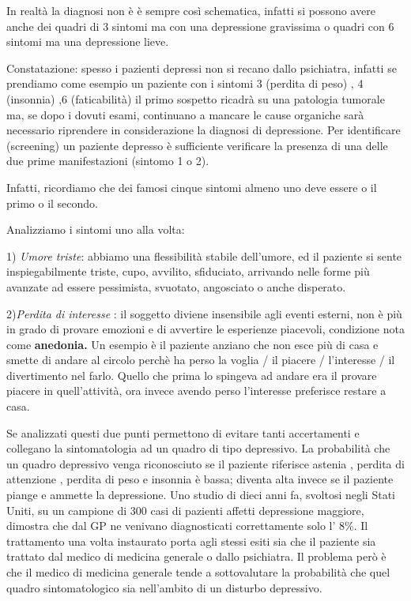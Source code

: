 \documentclass[]{article}
\begin{document}
In realtà la diagnosi non è è sempre così schematica, infatti si possono
avere anche dei quadri di 3 sintomi ma con una depressione gravissima o
quadri con 6 sintomi ma una depressione lieve.

Constatazione: spesso i pazienti depressi non si recano dallo
psichiatra, infatti se prendiamo come esempio un paziente con i sintomi
3 (perdita di peso) , 4 (insonnia) ,6 (faticabilità) il primo sospetto
ricadrà su una patologia tumorale ma, se dopo i dovuti esami, continuano
a mancare le cause organiche sarà necessario riprendere in
considerazione la diagnosi di depressione. Per identificare (screening)
un paziente depresso è sufficiente verificare la presenza di una delle
due prime manifestazioni (sintomo 1 o 2).

Infatti, ricordiamo che dei famosi cinque sintomi almeno uno deve essere
o il primo o il secondo.

Analizziamo i sintomi uno alla volta:

1) \emph{Umore triste}: abbiamo una flessibilità stabile dell'umore, ed
il paziente si sente inspiegabilmente triste, cupo, avvilito,
sfiduciato, arrivando nelle forme più avanzate ad essere pessimista,
svuotato, angosciato o anche disperato.

2)\emph{Perdita di interesse} : il soggetto diviene insensibile agli
eventi esterni, non è più in grado di provare emozioni e di avvertire le
esperienze piacevoli, condizione nota come \textbf{anedonia.} Un esempio
è il paziente anziano che non esce più di casa e smette di andare al
circolo perchè ha perso la voglia / il piacere / l'interesse / il
divertimento nel farlo. Quello che prima lo spingeva ad andare era il
provare piacere in quell'attività, ora invece avendo perso l'interesse
preferisce restare a casa.

Se analizzati questi due punti permettono di evitare tanti accertamenti
e collegano la sintomatologia ad un quadro di tipo depressivo. La
probabilità che un quadro depressivo venga riconosciuto se il paziente
riferisce astenia , perdita di attenzione , perdita di peso e insonnia è
bassa; diventa alta invece se il paziente piange e ammette la
depressione. Uno studio di dieci anni fa, svoltosi negli Stati Uniti, su
un campione di 300 casi di pazienti affetti depressione maggiore,
dimostra che dal GP ne venivano diagnosticati correttamente solo l' 8\%.
Il trattamento una volta instaurato porta agli stessi esiti sia che il
paziente sia trattato dal medico di medicina generale o dallo
psichiatra. Il problema però è che il medico di medicina generale tende
a sottovalutare la probabilità che quel quadro sintomatologico sia
nell'ambito di un disturbo depressivo.
\end{document}
